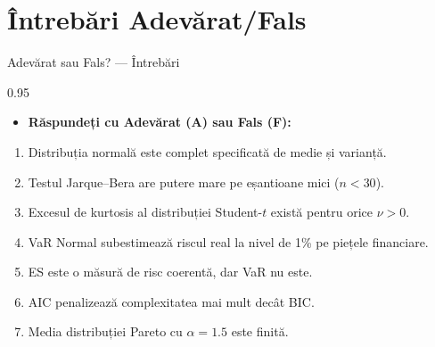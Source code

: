 \documentclass[9pt, aspectratio=169, t]{beamer}
\begin{document}
\section{Întrebări Adevărat/Fals}

\begin{frame}{Adevărat sau Fals? --- Întrebări}
\begin{cminipage}{0.95\textwidth}
    \begin{itemize}\setlength{\itemsep}{0pt}
        \item \textbf{Răspundeți cu Adevărat (A) sau Fals (F):}
    \end{itemize}
    \vspace{0.3cm}
    \begin{enumerate}\setlength{\itemsep}{0pt}
        \item Distribuția normală este complet specificată de medie și varianță.
        \item Testul Jarque--Bera are putere mare pe eșantioane mici ($n < 30$).
        \item Excesul de kurtosis al distribuției Student-$t$ există pentru orice $\nu > 0$.
        \item VaR Normal subestimează riscul real la nivel de 1\% pe piețele financiare.
        \item ES este o măsură de risc coerentă, dar VaR nu este.
        \item AIC penalizează complexitatea mai mult decât BIC.
        \item Media distribuției Pareto cu $\alpha = 1.5$ este finită.
    \end{enumerate}
\end{cminipage}
\end{frame}
\end{document}
